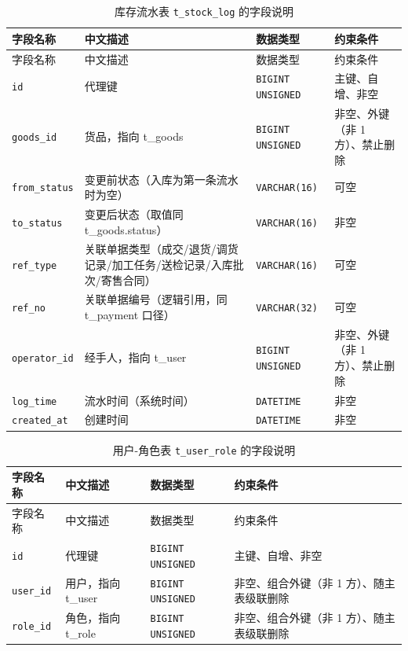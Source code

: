 \documentclass[12pt, a4paper]{ctexart}
\newcommand{\code}[1]{\texttt{\small #1}}
\begin{document}
\begin{longtable}{@{}p{3.1cm} p{4.5cm} p{2.4cm} p{4.5cm}@{}}
\caption{库存流水表 \code{t\_stock\_log} 的字段说明}\label{tab:f-t-stock-log}\\
\toprule
字段名称 & 中文描述 & 数据类型 & 约束条件 \\
\midrule
\endfirsthead
\toprule
字段名称 & 中文描述 & 数据类型 & 约束条件 \\
\midrule
\endhead
\bottomrule
\endlastfoot
\code{id} & 代理键 & \code{BIGINT UNSIGNED} & 主键、自增、非空 \\
\code{goods\_id} & 货品，指向 t\_goods & \code{BIGINT UNSIGNED} & 非空、外键（非 1 方）、禁止删除 \\
\code{from\_status} & 变更前状态（入库为第一条流水时为空） & \code{VARCHAR(16)} & 可空 \\
\code{to\_status} & 变更后状态（取值同 t\_goods.status） & \code{VARCHAR(16)} & 非空 \\
\code{ref\_type} & 关联单据类型（成交/退货/调货记录/加工任务/送检记录/入库批次/寄售合同） & \code{VARCHAR(16)} & 可空 \\
\code{ref\_no} & 关联单据编号（逻辑引用，同 t\_payment 口径） & \code{VARCHAR(32)} & 可空 \\
\code{operator\_id} & 经手人，指向 t\_user & \code{BIGINT UNSIGNED} & 非空、外键（非 1 方）、禁止删除 \\
\code{log\_time} & 流水时间（系统时间） & \code{DATETIME} & 非空 \\
\code{created\_at} & 创建时间 & \code{DATETIME} & 非空 \\
\end{longtable}

\begin{longtable}{@{}p{3.1cm} p{4.5cm} p{2.4cm} p{4.5cm}@{}}
\caption{用户-角色表 \code{t\_user\_role} 的字段说明}\label{tab:f-t-user-role}\\
\toprule
字段名称 & 中文描述 & 数据类型 & 约束条件 \\
\midrule
\endfirsthead
\toprule
字段名称 & 中文描述 & 数据类型 & 约束条件 \\
\midrule
\endhead
\bottomrule
\endlastfoot
\code{id} & 代理键 & \code{BIGINT UNSIGNED} & 主键、自增、非空 \\
\code{user\_id} & 用户，指向 t\_user & \code{BIGINT UNSIGNED} & 非空、组合外键（非 1 方）、随主表级联删除 \\
\code{role\_id} & 角色，指向 t\_role & \code{BIGINT UNSIGNED} & 非空、组合外键（非 1 方）、随主表级联删除 \\
\end{longtable}
\end{document}
